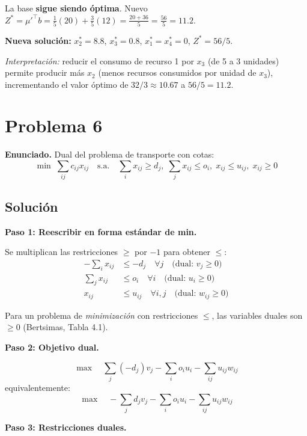 \documentclass{article}
\begin{document}
\begin{enumerate}[a)]
La base \textbf{sigue siendo óptima}. Nuevo $Z^*=\mu'^\top b=\tfrac{1}{5}(20)+\tfrac{3}{5}(12)=\tfrac{20+36}{5}=\tfrac{56}{5}=11.2$.

\textbf{Nueva solución:} $x_2^*=8.8$, $x_3^*=0.8$, $x_1^*=x_4^*=0$, $Z^*=56/5$.

\textit{Interpretación:} reducir el consumo de recurso 1 por $x_3$ (de 5 a 3 unidades) permite producir más $x_2$ (menos recursos consumidos por unidad de $x_3$), incrementando el valor óptimo de $32/3\approx10.67$ a $56/5=11.2$.

\end{enumerate}

\newpage
\section*{Problema 6}

\textbf{Enunciado.} Dual del problema de transporte con cotas:
$$\min\;\sum_{ij}c_{ij}x_{ij}\quad\text{s.a.}\quad\sum_i x_{ij}\geq d_j,\;\sum_j x_{ij}\leq o_i,\;x_{ij}\leq u_{ij},\;x_{ij}\geq0$$

\subsection*{Solución}

\textbf{Paso 1: Reescribir en forma estándar de min.}

Se multiplican las restricciones $\geq$ por $-1$ para obtener $\leq$:
\begin{align*}
-\sum_i x_{ij}&\leq -d_j\quad \forall j\quad\text{(dual: }v_j\geq0\text{)}\\
\sum_j x_{ij}&\leq o_i \quad\forall i\quad\text{(dual: }u_i\geq0\text{)}\\
x_{ij}&\leq u_{ij}\quad\forall i,j\quad\text{(dual: }w_{ij}\geq0\text{)}
\end{align*}

Para un problema de \emph{minimización} con restricciones $\leq$, las variables duales son $\geq0$ (Bertsimas, Tabla 4.1).

\textbf{Paso 2: Objetivo dual.}

$$\max\quad\sum_j(-d_j)v_j-\sum_i o_i u_i-\sum_{ij}u_{ij}w_{ij}$$
equivalentemente:
$$\max\quad-\sum_j d_j v_j-\sum_i o_i u_i-\sum_{ij}u_{ij}w_{ij}$$

\textbf{Paso 3: Restricciones duales.}
\end{document}
